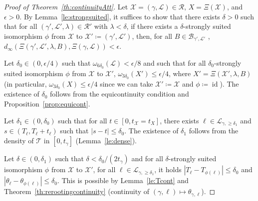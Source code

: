 \documentclass[11pt]{article}
\def\Conf{{\mathscr{R}}}
\def\Att{{\Xi}}
\begin{document}
\begin{proof}[Proof of Theorem~\ref{th:continuityAtt}]
Let $\mathcal{X}=(\gamma,\mathcal{L})\in \Conf$, $X=\Att(\mathcal{X})$, and $\epsilon>0$.
By Lemma~\ref{le:strongsuited}, it suffices to show that there exists $\delta>0$ such that for all $(\gamma',\mathcal{L}',\lambda)\in \Conf'$ with $\lambda<\delta$, if there exists a $\delta$-strongly suited isomorphism $\phi$ from $\mathcal{X}$ to $\mathcal{X}'\coloneqq (\gamma',\mathcal{L}')$, then, for all  $B\in \mathcal{B}_{\gamma',\mathcal{L}'}$ , $ d_\infty(\Att(\gamma',\mathcal{L}',\lambda, B) ,\Att(\gamma,\mathcal{L})   )<\epsilon$.

Let $\delta_0\in(0,\epsilon/4)$ such that $\omega_{6 \delta_0}(\mathcal{L})<\epsilon/8$ and such that for all $\delta_0$-strongly suited isomorphism $\phi$ from $\mathcal{X}$ to $\mathcal{X}'$,
$\omega_{3\delta_0}(X')\leq \epsilon/4$, where $X'=\Att(\mathcal{X}', \lambda,B)$ (in particular, $\omega_{3\delta_0}(X)\leq \epsilon/4$ since we can take $\mathcal{X}'\coloneqq\mathcal{X}$ and $\phi\coloneqq\operatorname{id}$). The existence of $\delta_0$ follows from the equicontinuity condition and Proposition~\ref{prop:equicont}.


Let $\delta_1\in(0,\delta_0)$ such that for all $t\in [0,t_{\mathcal{X}}=t_X]$, there exists $\ell \in \mathcal{L}_{\gamma,\geq \delta_1}$ and $s\in(T_\ell,T_\ell+t_\ell)$ such that $|s-t|\leq \delta_0$. The existence of $\delta_1$ follows from the density of $\mathcal{T}$ in $[0,t_\gamma]$ (Lemma~\ref{le:dense}).


Let $\delta\in(0,\delta_1)$ such that $\delta<\delta_0/(2t_\gamma)$ and for all $\delta$-strongly suited isomorphism $\phi$ from $\mathcal{X}$ to $\mathcal{X}'$, for all $\ell\in \mathcal{L}_{\gamma,\geq \delta_1}$, it holds
$|T_\ell-T_{\phi(\ell)}|\leq \delta_0$ and $|\theta_\ell-\theta_{\phi(\ell)}|\leq \delta_0$. This is possible by Lemma~\ref{le:Tcont} and Theorem~\ref{th:rerootingcontinuity} (continuity of $(\gamma,\ell)\mapsto \theta_{\gamma,\ell}$).


\end{proof}
\end{document}
